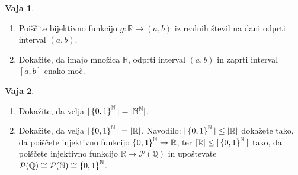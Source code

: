 \documentclass{article}
\newcommand{\pow}{\mathcal{P}}
\newcommand{\NN}{\mathbb{N}}
\newcommand{\QQ}{\mathbb{Q}}
\newcommand{\RR}{\mathbb{R}}
\theoremstyle{definition}
\newtheorem{vaja}{Vaja}
\begin{document}
\begin{vaja}
  \
  \begin{enumerate}
    \item
      Poiščite bijektivno funkcijo $g\colon \RR \to (a,b)$ iz realnih števil na dani odprti interval $(a,b)$.
    \item
      Dokažite, da imajo množica $\RR$, odprti interval $(a,b)$ in zaprti interval $[a,b]$ enako moč.
  \end{enumerate}
\end{vaja}


\begin{vaja}
  \
  \begin{enumerate}
    \item
      Dokažite, da velja $|\set{0,1}^\NN| = |\NN^\NN|$.
    \item
      Dokažite, da velja $|\set{0,1}^\NN| = |\RR|$. Navodilo: $|\set{0,1}^\NN| \leq |\RR|$ dokažete tako, da poiščete injektivno funkcijo $\set{0,1}^\NN \to \RR$, ter $|\RR| \leq |\set{0,1}^\NN|$ tako, da poiščete injektivno funkcijo $\RR \to \pow(\QQ)$ in upoštevate $\pow(\QQ) \cong \pow(\NN) \cong \set{0,1}^\NN$.
  \end{enumerate}
\end{vaja}
\end{document}

